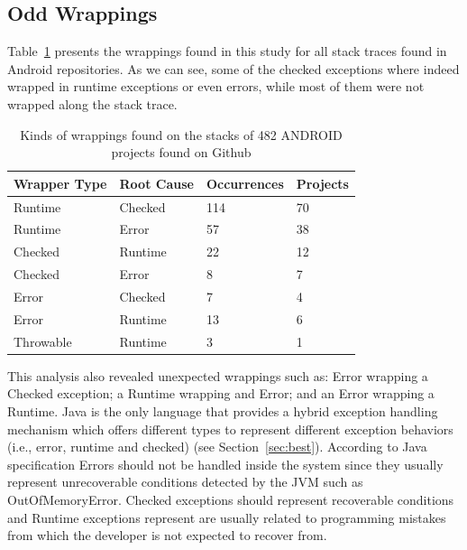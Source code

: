\documentclass[conference]{IEEEtran}
\begin{document}
\subsection{Odd Wrappings}
Table~\ref{tab:wrappingandroid} presents the wrappings found in this study for all
stack traces found in Android repositories. As we can see, some of the checked
exceptions where indeed wrapped in runtime exceptions or even errors, while most
of them were not wrapped along the stack trace. 

\begin{table}
\centering
\begin{tabular}{llll}
    \hline
    \bfseries{Wrapper Type} & \bfseries{Root Cause} & \bfseries{Occurrences} & \bfseries{Projects} \\
    \hline
      Runtime &  Checked   & 114  & 70  \\
      Runtime   &  Error   & 57   & 38  \\
      Checked &  Runtime   & 22   & 12  \\
      Checked & Error    &  8    & 7 \\
      Error & Checked     &  7    & 4 \\
      Error & Runtime     &  13   & 6 \\
      Throwable & Runtime &  3    & 1 \\
    \hline
  \end{tabular}
\caption{Kinds of wrappings found on the stacks of 482 ANDROID projects found on Github}
\label{tab:wrappingandroid}
\end{table}

This analysis also revealed unexpected wrappings such as: Error wrapping a Checked 
exception; a Runtime wrapping and Error; and an Error wrapping a Runtime.
Java is the only language that provides a hybrid exception handling mechanism
which offers  different types to represent different exception behaviors (i.e., error, 
runtime and checked) (see Section~\ref{sec:best}). According to Java specification Errors should not be
handled inside the system since they usually represent unrecoverable conditions
detected by the JVM such as OutOfMemoryError. Checked exceptions should
represent recoverable conditions and  Runtime exceptions represent are usually
related to programming mistakes from which the developer is not expected to recover
from. 
\end{document}
